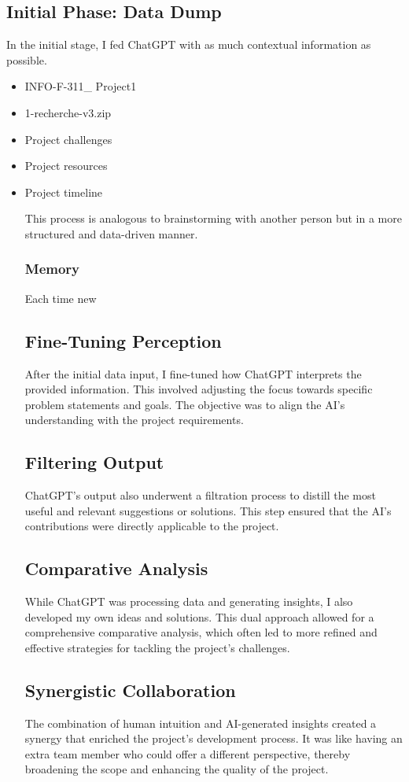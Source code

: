 \documentclass{article}
\begin{document}
\subsection{Initial Phase: Data Dump}
In the initial stage, I fed ChatGPT with as much contextual information as possible. 
\begin{itemize}
    \item INFO-F-311_ Project1
    \item 1-recherche-v3.zip
    \item Project challenges
    \item Project resources
    \item Project timeline

This process is analogous to brainstorming with another person but in a more structured and data-driven manner.

\subsubsection{Memory}

Each time new 

\subsection{Fine-Tuning Perception}
After the initial data input, I fine-tuned how ChatGPT interprets the provided information. 
This involved adjusting the focus towards specific problem statements and goals. 
The objective was to align the AI's understanding with the project requirements.

\subsection{Filtering Output}
ChatGPT's output also underwent a filtration process to distill the most useful and relevant suggestions or solutions. 
This step ensured that the AI's contributions were directly applicable to the project.

\subsection{Comparative Analysis}
While ChatGPT was processing data and generating insights, I also developed my own ideas and solutions. This dual approach allowed for a comprehensive comparative analysis, which often led to more refined and effective strategies for tackling the project's challenges.

\subsection{Synergistic Collaboration}
The combination of human intuition and AI-generated insights created a synergy that enriched the project's development process. It was like having an extra team member who could offer a different perspective, thereby broadening the scope and enhancing the quality of the project.


\end{itemize}
\end{document}
